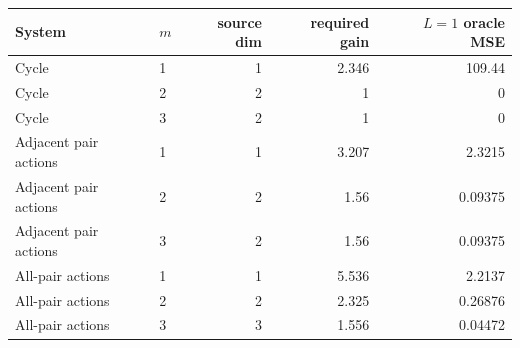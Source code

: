 \begin{tabular}{llrrr}
\toprule
System & $m$ & source dim & required gain & $L=1$ oracle MSE \\
\midrule
Cycle & 1 & 1 & 2.346 & 109.44 \\
Cycle & 2 & 2 & 1 & 0 \\
Cycle & 3 & 2 & 1 & 0 \\
Adjacent pair actions & 1 & 1 & 3.207 & 2.3215 \\
Adjacent pair actions & 2 & 2 & 1.56 & 0.09375 \\
Adjacent pair actions & 3 & 2 & 1.56 & 0.09375 \\
All-pair actions & 1 & 1 & 5.536 & 2.2137 \\
All-pair actions & 2 & 2 & 2.325 & 0.26876 \\
All-pair actions & 3 & 3 & 1.556 & 0.04472 \\
\bottomrule
\end{tabular}
